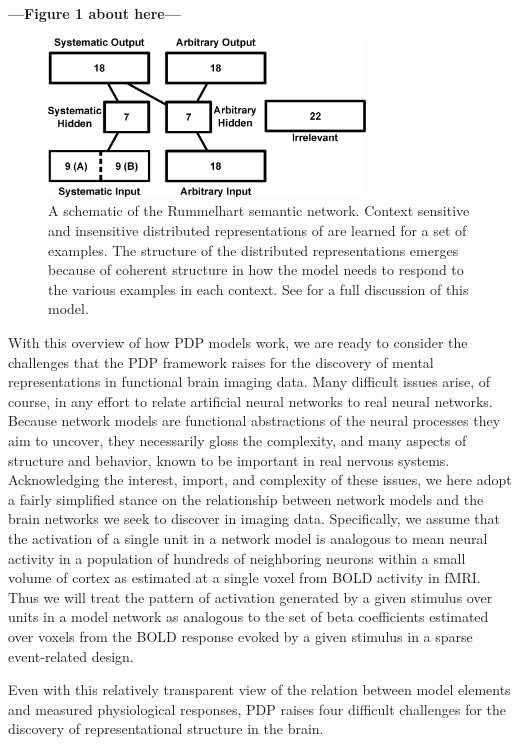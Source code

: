 \textbf{---Figure 1 about here---}
\begin{figure}
\centering
\includegraphics[width=0.75\textwidth]{figures/model_outline.eps}
\caption{\label{fig.sem_net} A schematic of the Rummelhart semantic network. Context sensitive and insensitive distributed representations of are learned for a set of examples. The structure of the distributed representations emerges because of coherent structure in how the model needs to respond to the various examples in each context. See \protect\cite{rogers_semantic_2004} for a full discussion of this model.}
\end{figure}


With this overview of how PDP models work, we are ready to consider the challenges that the PDP framework raises for the discovery of mental representations in functional brain imaging data. Many difficult issues arise, of course, in any effort to relate artificial neural networks to real neural networks. Because network models are functional abstractions of the neural processes they aim to uncover, they necessarily gloss the complexity, and many aspects of structure and behavior, known to be important in real nervous systems. Acknowledging the interest, import, and complexity of these issues, we here adopt a fairly simplified stance on the relationship between network models and the brain networks we seek to discover in imaging data. Specifically, we assume that the activation of a single unit in a network model is analogous to mean neural activity in a population of hundreds of neighboring neurons within a small volume of cortex as estimated at a single voxel from BOLD activity in fMRI. Thus we will treat the pattern of activation generated by a given stimulus over units in a model network as analogous to the set of beta coefficients estimated over voxels from the BOLD response evoked by a given stimulus in a sparse event-related design. 

Even with this relatively transparent view of the relation between model elements and measured physiological responses, PDP raises four difficult challenges for the discovery of representational structure in the brain.


